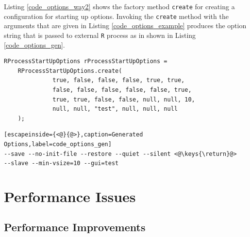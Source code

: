 \documentclass[10pt,a4paper, final, oneside]{article}
\begin{document}
Listing \ref{code_options_way2} shows the factory method \texttt{create} for creating a configuration for starting up options. Invoking the \texttt{create} method with the arguments that are given in Listing \ref{code_options_example} produces the option string that is passed to external \texttt{R} process as in shown in Listing \ref{code_options_gen}.

\begin{minipage}{\linewidth}
\begin{lstlisting}[caption=Custom RProcessStartUpOptions Creator,label=code_options_example]
RProcessStartUpOptions rProcessStartUpOptions = 
	RProcessStartUpOptions.create(
              true, false, false, false, true, true, 
              false, false, false, false, false, true, 
              true, true, false, false, null, null, 10, 
              null, null, "test", null, null, null
    );
\end{lstlisting}
\end{minipage}


\begin{minipage}{\linewidth}
\begin{lstlisting}[escapeinside={<@}{@>},caption=Generated Options,label=code_options_gen]
--save --no-init-file --restore --quiet --silent <@\keys{\return}@>
--slave --min-vsize=10 --gui=test
\end{lstlisting}
\end{minipage}

\section{Performance Issues}
\label{sec:performance_issues}

\subsection{Performance Improvements}
\label{sec:performance_improvements}
\end{document}
